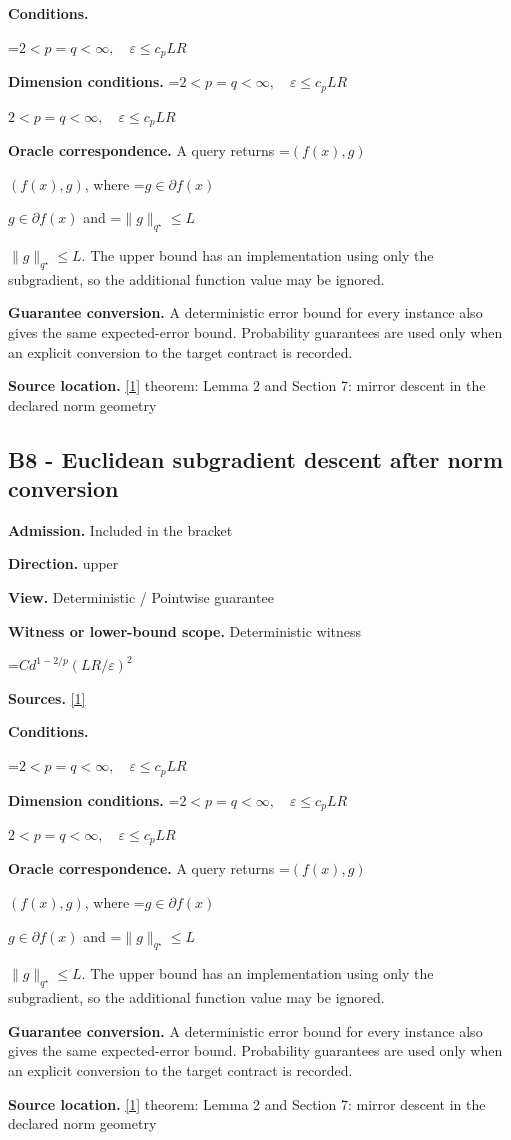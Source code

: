 \documentclass[10pt,a4paper]{article}
\newcommand{\AtlasMath}[1]{\par\begingroup\centering\setbox0=\hbox{$\displaystyle #1$}\ifdim\wd0>1.4\linewidth\typeout{ATLAS WIDE FORMULA: \the\wd0}\fi\ifdim\wd0>\linewidth\resizebox{\linewidth}{!}{\box0}\else\box0\fi\par\endgroup}
\newcommand{\AtlasInlineMath}[1]{\begingroup\setbox0=\hbox{$#1$}\ifdim\wd0>.4\linewidth\endgroup\AtlasMath{#1}\else\endgroup$#1$\fi}
\begin{document}
\textbf{Conditions.} 
\AtlasMath{2<p=q<\infty,\quad\varepsilon\le c_pLR}


\textbf{Dimension conditions.} \AtlasInlineMath{2<p=q<\infty,\quad\varepsilon\le c_pLR}

\textbf{Oracle correspondence.} A query returns \AtlasInlineMath{(f(x),g)}, where \AtlasInlineMath{g\in\partial f(x)} and \AtlasInlineMath{\|g\|_{q^\star}\le L}. The upper bound has an implementation using only the subgradient, so the additional function value may be ignored.

\textbf{Guarantee conversion.} A deterministic error bound for every instance also gives the same expected-error bound. Probability guarantees are used only when an explicit conversion to the target contract is recorded.

\textbf{Source location.} \href{https://arxiv.org/pdf/1107.4080}{[1]} theorem: Lemma 2 and Section 7: mirror descent in the declared norm geometry

\subsection{B8 - Euclidean subgradient descent after norm conversion}
\textbf{Admission.} Included in the bracket

\textbf{Direction.} upper

\textbf{View.} Deterministic / Pointwise guarantee

\textbf{Witness or lower-bound scope.} Deterministic witness

\AtlasMath{C d^{1-2/p}(LR/\varepsilon)^2}
\textbf{Sources.} \href{https://arxiv.org/pdf/1107.4080}{[1]}

\textbf{Conditions.} 
\AtlasMath{2<p=q<\infty,\quad\varepsilon\le c_pLR}


\textbf{Dimension conditions.} \AtlasInlineMath{2<p=q<\infty,\quad\varepsilon\le c_pLR}

\textbf{Oracle correspondence.} A query returns \AtlasInlineMath{(f(x),g)}, where \AtlasInlineMath{g\in\partial f(x)} and \AtlasInlineMath{\|g\|_{q^\star}\le L}. The upper bound has an implementation using only the subgradient, so the additional function value may be ignored.

\textbf{Guarantee conversion.} A deterministic error bound for every instance also gives the same expected-error bound. Probability guarantees are used only when an explicit conversion to the target contract is recorded.

\textbf{Source location.} \href{https://arxiv.org/pdf/1107.4080}{[1]} theorem: Lemma 2 and Section 7: mirror descent in the declared norm geometry
\end{document}
